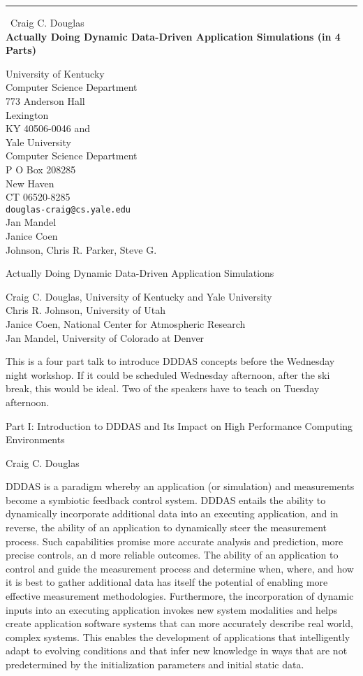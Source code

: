 \documentclass{report}
\begin{document}
\begin{center}
\rule{6in}{1pt} \
{\large Craig C. Douglas \\
{\bf Actually Doing Dynamic Data-Driven Application Simulations (in 4 Parts)}}

University of Kentucky \\ Computer Science Department \\ 773 Anderson Hall \\ Lexington \\ KY 40506-0046 and \\ Yale University \\ Computer Science Department \\ P O Box 208285 \\ New Haven \\ CT 06520-8285
\\
{\tt douglas-craig@cs.yale.edu}\\
Jan Mandel\\
Janice Coen\\
	Johnson, Chris R.
	Parker, Steve G.\end{center}

Actually Doing Dynamic Data-Driven Application Simulations

Craig C. Douglas, University of Kentucky and Yale University\\
Chris R. Johnson, University of Utah\\
Janice Coen, National Center for Atmospheric Research\\
Jan Mandel, University of Colorado at Denver

This is a four part talk to introduce DDDAS concepts before the Wednesday
night workshop. If it could be scheduled Wednesday afternoon, after the
ski break, this would be ideal. Two of the speakers have to teach on
Tuesday afternoon.

Part I: Introduction to DDDAS and Its Impact on High Performance Computing Environments

Craig C. Douglas

DDDAS is a paradigm whereby an application (or simulation) and
measurements become a symbiotic feedback control system. DDDAS entails
the ability to dynamically incorporate additional data into an executing
application, and in reverse, the ability of an application to dynamically
steer the measurement process. Such capabilities promise more accurate
analysis and prediction, more precise controls, an d more reliable
outcomes. The ability of an application to control and guide the
measurement process and determine when, where, and how it is best to
gather additional data has itself the potential of enabling more
effective measurement methodologies. Furthermore, the incorporation of
dynamic inputs into an executing application invokes new system
modalities and helps create application software systems that can more
accurately describe real world, complex systems. This enables the
development of applications that intelligently adapt to evolving
conditions and that infer new knowledge in ways that are not
predetermined by the initialization parameters and initial static data.
\end{document}

